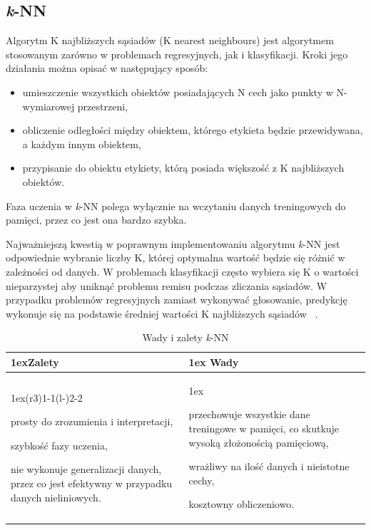 \subsection{\textit{k}-NN}

Algorytm K najbliższych sąsiadów (K nearest neighbours) jest algorytmem
stosowanym zarówno w problemach regresyjnych, jak i klasyfikacji. Kroki jego działania
można opisać w następujący sposób:
\begin{itemize}
    \item umieszczenie wszystkich obiektów posiadających N cech jako punkty w N-wymiarowej przestrzeni,
    \item obliczenie odległości między obiektem, którego etykieta będzie przewidywana, a każdym innym
    obiektem,
    \item przypisanie do obiektu etykiety, którą posiada większość z K najbliższych obiektów. 
\end{itemize}
Faza uczenia w \textit{k}-NN polega wyłącznie na wczytaniu danych treningowych do pamięci, przez co jest 
ona bardzo szybka.

Najważniejszą kwestią w poprawnym implementowaniu algorytmu \textit{k}-NN jest odpowiednie wybranie liczby
K, której optymalna wartość będzie się różnić w zależności od danych. W problemach 
klasyfikacji często wybiera się K o wartości nieparzystej aby uniknąć problemu remisu
podczas zliczania sąsiadów. W przypadku problemów regresyjnych zamiast wykonywać głosowanie,
predykcję wykonuje się na podstawie średniej wartości K najbliższych sąsiadów ~\cite{MLAlgorithms}.

\begin{table}[h]
    \begin{tabularx}{\linewidth}{>{\parskip1ex}X@{\kern4\tabcolsep}>{\parskip1ex}X}
    \toprule
    \hfil\bfseries Zalety
    &
    \hfil\bfseries Wady
    \\\cmidrule(r{3\tabcolsep}){1-1}\cmidrule(l{-\tabcolsep}){2-2}
    
    prosty do zrozumienia i interpretacji,\par
    szybkość fazy uczenia,\par
    nie wykonuje generalizacji danych, przez co jest efektywny w przypadku danych nieliniowych.\par
    &
    
    przechowuje wszystkie dane treningowe w pamięci, co skutkuje wysoką złożonością pamięciową,\par
    wrażliwy na ilość danych i nieistotne cechy,\par
    kosztowny obliczeniowo.\par
    \\\bottomrule
    \end{tabularx}
    \caption{Wady i zalety \textit{k}-NN}
\end{table}
    

